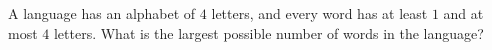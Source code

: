 A language has an alphabet of $4$ letters, and every word has at least $1$ and at most $4$ letters. What is the largest possible number of words in the language?

